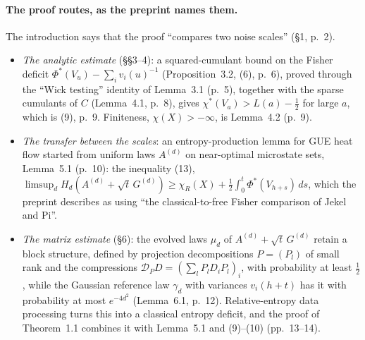 \documentclass[11pt]{article}
\newcommand{\D}{\mathcal{D}}
\newcommand{\ploc}[2]{#1}
\newcounter{finding}
\begin{document}
\paragraph{The proof routes, as the preprint names them.}
The introduction says that the proof ``compares two noise scales''
\ploc{(\S1, p.~2)}{01-introduction.tex:58--93}.
\begin{itemize}
\item \emph{The analytic estimate} (\S\S3--4): a squared-cumulant bound on the
Fisher deficit $\Phi^*(V_u)-\sum_i v_i(u)^{-1}$
\ploc{(Proposition~3.2, (6), p.~6)}{03-fisher.tex:100--113}, proved through
the ``Wick testing'' identity of
\ploc{Lemma~3.1 (p.~5)}{03-fisher.tex:28--49}, together with the sparse
cumulants of $C$ \ploc{(Lemma~4.1, p.~8)}{04-signal.tex:45--75}, gives
$\chi^*(V_a)>L(a)-\frac12$ for large $a$, which is
\ploc{(9), p.~9}{04-signal.tex:102--104}. Finiteness,
$\chi(X)>-\infty$, is \ploc{Lemma~4.2 (p.~9)}{04-signal.tex:149--170}.
\item \emph{The transfer between the scales}: an entropy-production lemma for
GUE heat flow started from uniform laws $A^{(d)}$ on near-optimal microstate
sets, \ploc{Lemma~5.1 (p.~10)}{05-flow.tex:10--21}:
the inequality \ploc{(13)}{05-flow.tex:16--19},
$\limsup_d H_d(A^{(d)}+\sqrt t\,G^{(d)})\ge\chi_R(X)+\frac12\int_0^t\Phi^*(V_{h+s})\,ds$,
which the preprint describes as using
``the classical-to-free Fisher comparison of Jekel and Pi''.
\item \emph{The matrix estimate} (\S6): the evolved laws $\mu_d$ of
$A^{(d)}+\sqrt t\,G^{(d)}$ retain a block structure, defined by projection
decompositions $P=(P_l)$ of small rank and the compressions
$\D_PD=(\sum_lP_lD_iP_l)_i$, with probability at least $\frac12$, while the
Gaussian reference law $\gamma_d$ with variances $v_i(h+t)$ has it with
probability at most $e^{-4d^2}$
\ploc{(Lemma~6.1, p.~12)}{06-blocks.tex:79--87}. Relative-entropy data
processing turns this into a classical entropy deficit, and the proof of
Theorem~1.1 combines it with Lemma~5.1 and (9)--(10)
\ploc{(pp.~13--14)}{06-blocks.tex:154--209}.
\end{itemize}
\space%

\end{document}
